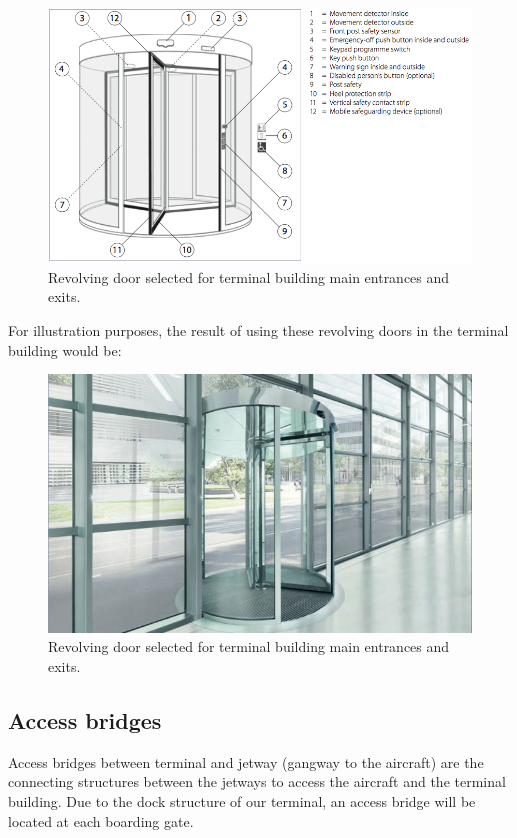 		\begin{figure}[ht!]
	\centering
\includegraphics[width=13cm]{./images/Facade/scheme}
\caption{Revolving door selected for terminal building main entrances and exits.}
\end{figure}

For illustration purposes, the result of using these revolving doors in the terminal building would be:

		\begin{figure}[ht!]
	\centering
\includegraphics[width=13cm]{./images/Facade/revolving}
\caption{Revolving door selected for terminal building main entrances and exits.}
\end{figure}
	
	
		\subsection{Access bridges}
	Access bridges between terminal and jetway (gangway to the aircraft) are the connecting structures between the jetways to access the aircraft and the terminal building. Due to the dock structure of our terminal, an access bridge will be located at each boarding gate.
	
